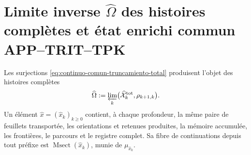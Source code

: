 \section{Limite inverse \(\widehat\Omega\) des histoires complètes et état enrichi commun APP–TRIT–TPK}
\label{sec:continuo-comun-limite}

Les surjections \eqref{eq:continuo-comun-truncamiento-total} produisent l'objet des histoires complètes
\begin{equation}
\label{eq:continuo-comun-omega}
 \widehat\Omega
 :=\varprojlim_k
 \bigl(\widehat{\mathcal X}^{\rm tot}_k,\rho_{k+1,k}\bigr).
\end{equation}
Un élément \(\widehat x=(\widehat x_k)_{k\geq0}\) contient, à chaque profondeur, la même paire de feuillets transportée, les orientations et retenues produites, la mémoire accumulée, les frontières, le parcours et le registre complet. Sa fibre de continuations depuis tout préfixe est \(\operatorname{Msect}(\widehat x_k)\), munie de \(\mu_{\widehat x_k}\).

